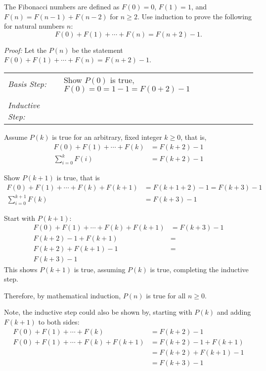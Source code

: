 \begin{questions}


 The Fibonacci numbers are defined as $F(0) = 0$, $F(1) = 1$, and $F(n) = F(n-1) + F(n-2)$ for $n \geq 2$.   Use induction to prove the following for natural numbers $n$:
\[ F(0) + F(1) + \cdots + F(n) = F(n+2) - 1.  \]
    \ifprintanswers
        \vspace{-10pt}
   \fi
\begin{solution}
  \textit{Proof:}
  Let the $P(n)$ be the statement $F(0) + F(1) + \cdots + F(n) = F(n+2) -1$.

  \smallskip
  \begin{tabular}{lp{4in}}
    \textit{Basis Step:} & Show $P(0)$ is true, $F(0) = 0 = 1 - 1 = F(0+2) - 1$ \\
     & \\
   \textit{Inductive Step:} &  \\
  \end{tabular}

  Assume $P(k)$ is true for an arbitrary, fixed integer $k \geq 0$, that is,
  \begin{align*}
    F(0) + F(1) + \cdots + F(k) &= F(k+2) - 1  \tag{IH} \\
    \sum_{i=0}^k F(i) &= F(k+2) - 1
  \end{align*}

  Show $P(k+1)$ is true, that is
  \begin{align*}
    F(0) + F(1) + \cdots + F(k) + F(k+1) &= F(k+1+2) - 1 = F(k+3) - 1 \\
    \sum_{i=0}^{k+1} F(k) &= F(k+3) - 1
  \end{align*}

  Start with $P(k+1)$:
  \begin{align*}
    F(0) + F(1) + \cdots + F(k) + F(k+1) &= F(k+3) - 1  \\
    F(k+2) - 1 + F(k+1) &= \tag{IH} \\
    F(k+2) + F(k+1) - 1 &= \\
    F(k+3) - 1
  \end{align*}
  This shows $P(k+1)$ is true, assuming $P(k)$ is true, completing the inductive step. 

  \smallskip
  Therefore, by mathematical induction, $P(n)$ is true for all $n \geq 0$.

  \smallskip
  Note, the inductive step could also be shown by, starting with $P(k)$ and adding $F(k+1)$ to both sides:
  \begin{align*}
    F(0) + F(1) + \cdots + F(k) &= F(k+2) - 1 \tag{IH} \\
    F(0) + F(1) + \cdots + F(k) + F(k+1) &= F(k+2) - 1 + F(k+1) \\
     &= F(k+2) + F(k+1) - 1 \\
     &= F(k+3) -1 
  \end{align*}
\end{solution}



\end{questions}
